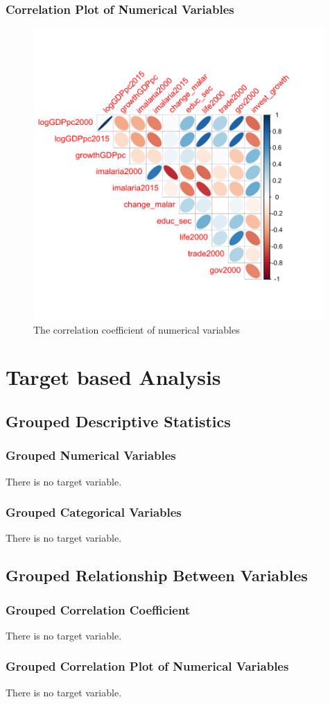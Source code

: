 \documentclass{book}\usepackage[]{graphicx}\usepackage[]{color}
\begin{document}
\subsection{Correlation Plot of Numerical Variables}
\begin{figure}[!ht]
\centering
\includegraphics[width=0.99\textwidth]{figure/correlation.pdf}
\caption{The correlation coefficient of numerical variables}
\end{figure}


\chapter{Target based Analysis}
\section{Grouped Descriptive Statistics}
\subsection{Grouped Numerical Variables}

There is no target variable.



\subsection{Grouped Categorical Variables}

There is no target variable.



\section{Grouped Relationship Between Variables}
\subsection{Grouped Correlation Coefficient}
There is no target variable.



\subsection{Grouped Correlation Plot of Numerical Variables}
There is no target variable.
\end{document}
